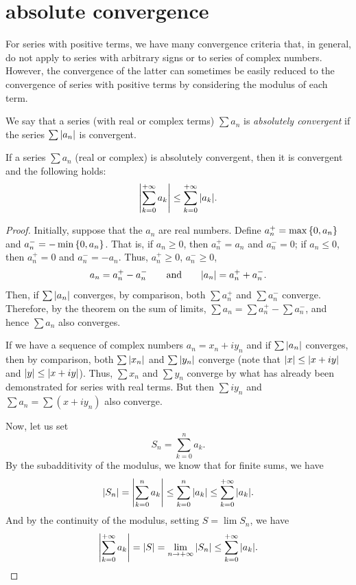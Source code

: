 \section{absolute convergence}

For series with positive terms, we have many convergence criteria that, in
general, do not apply to series with arbitrary signs or to series of complex
numbers. However, the convergence of the latter can sometimes be easily reduced
to the convergence of series with positive terms by considering the modulus of
each term.

\begin{definition}
\mymark{***}
We say that a series (with real or complex terms) $\sum a_n$ is \emph{absolutely
convergent}%
%
 if the series $\sum {\left|a_n\right|}$ is convergent.
\end{definition}

\begin{theorem}\label{th:convergenza_assoluta}
\mymark{***}%
If a series $\sum a_n$ (real or complex) is absolutely convergent, then it is
convergent and the following holds:
\[
  {\left|\sum_{k=0}^{+\infty} a_k\right|} \le \sum_{k=0}^{+\infty} {\left|a_k\right|}.
\]
\end{theorem}
%
\begin{proof}
\mymark{*}
Initially, suppose that the $a_n$ are real numbers. Define $a_n^+ =
\max{\left\{ 0, a_n \right\}}$ and $a_n^- = -\min {\left\{ 0, a_n \right\}}$. That is, if $a_n\ge
0$, then $a_n^+ = a_n$ and $a_n^-=0$; if $a_n\le 0$, then $a_n^+ =0$ and $a_n^-
= -a_n$. Thus, $a_n^+\ge 0$, $a_n^-\ge 0$,
\[
   a_n = a_n^+  - a_n^-
   \qquad\text{and}\qquad
   {\left|a_n\right|} = a_n^+ + a_n^-.
\]
Then, if $\sum {\left|a_n\right|}$ converges, by comparison, both $\sum a_n^+$ and $\sum
a_n^-$ converge. Therefore, by the theorem on the sum of limits, $\sum a_n =
\sum a_n^+ - \sum a_n^-$, and hence $\sum a_n$ also converges.

If we have a sequence of complex numbers $a_n = x_n + i y_n$ and if $\sum
{\left|a_n\right|}$ converges, then by comparison, both $\sum {\left|x_n\right|}$ and
$\sum{\left|y_n\right|}$ converge (note that ${\left|x\right|} \le {\left|x+iy\right|}$ and ${\left|y\right|}\le
{\left|x+iy\right|}$). Thus, $\sum x_n$ and $\sum y_n$ converge by what has already been
demonstrated for series with real terms. But then $\sum i y_n$ and $\sum a_n =
\sum (x + iy_n)$ also converge.

Now, let us set
\[
  S_n  = \sum_{k=0}^n a_k.
\]
By the subadditivity of the modulus, we know that for finite sums, we have
\[
 {\left|S_n\right|} ={\left|\sum_{k=0}^n a_k\right|}
 \le \sum_{k=0}^n {\left|a_k\right|} \le \sum_{k=0}^{+\infty} {\left|a_k\right|}.
\]
And by the continuity of the modulus, setting $S= \lim S_n$, we have
\[
  {\left|\sum_{k=0}^{+\infty} a_k\right|}
  = {\left|S\right|}
  = \lim_{n\to +\infty} {\left|S_n\right|}
  \le \sum_{k=0}^{+\infty} {\left|a_k\right|}.
\]
\end{proof}


